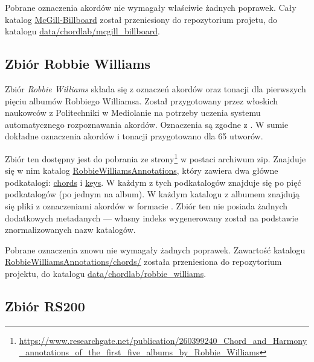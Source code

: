 Pobrane oznaczenia akordów nie wymagały właściwie żadnych poprawek. Cały katalog \url{McGill-Billboard} został przeniesiony do repozytorium projetu, do katalogu \url{data/chordlab/mcgill_billboard}.

\subsection{Zbiór Robbie Williams}

Zbiór \emph{Robbie Williams} \cite{giorgi_automatic_2013} składa się z oznaczeń akordów oraz tonacji dla pierwszych pięciu albumów Robbiego Williamsa. Został przygotowany przez włoskich naukowców z Politechniki w Mediolanie na potrzeby uczenia systemu automatycznego rozpoznawania akordów.  Oznaczenia są zgodne z \cite{harte_towards_nodate}. W sumie dokładne oznaczenia akordów i tonacji przygotowano dla 65 utworów.

Zbiór ten dostępny jest do pobrania ze strony\footnote{\url{https://www.researchgate.net/publication/260399240_Chord_and_Harmony_annotations_of_the_first_five_albums_by_Robbie_Williams}} w postaci archiwum zip. Znajduje się w nim katalog \url{RobbieWilliamsAnnotations}, który zawiera dwa główne podkatalogi: \url{chords} i \url{keys}. W każdym z tych podkatalogów znajduje się po pięć podkatalogów (po jednym na album). W każdym katalogu z albumem znajdują się pliki  z oznaczeniami akordów w formacie . Zbiór ten nie posiada żadnych dodatkowych metadanych --- własny indeks wygenerowany został na podstawie znormalizowanych nazw katalogów.

Pobrane oznaczenia znowu nie wymagały żadnych poprawek. Zawartość katalogu \url{RobbieWilliamsAnnotations/chords/} została przeniesiona do repozytorium projektu, do katalogu \url{data/chordlab/robbie_williams}.

\subsection{Zbiór RS200}

